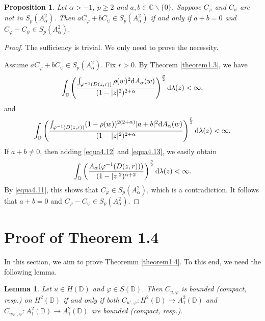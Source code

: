 \documentclass[preprint,12pt,times]{elsarticle}
\newtheorem{lemma}[theorem]{Lemma}
\newtheorem{proposition}[theorem]{Proposition}
\theoremstyle{definition}
\theoremstyle{remark}
\numberwithin{equation}{section}
\begin{document}
\begin{proposition}\label{proposition4.4}
Let $\alpha>-1$, $p\geq 2$ and $a,b\in\mathbb{C}\backslash\{0\}$. Suppose $C_{\varphi}$ and $C_{\psi}$ are not in $S_{p}(A_{\alpha}^2)$. Then $aC_{\varphi}+bC_{\psi}\in S_p(A_{\alpha}^2)$ if and only if $a+b=0$ and $C_{\varphi}-C_{\psi}\in S_p(A_{\alpha}^2)$.
\end{proposition}

\begin{proof}
The sufficiency is trivial. We only need to prove the necessity.

Assume $aC_{\varphi}+bC_{\psi}\in S_p(A_{\alpha}^2)$. Fix $r>0$. By Theorem \ref{theorem1.3}, we have
\begin{equation}\label{equa4.12}
\int_{\mathbb{D}}\left(\frac{\int_{\varphi^{-1}(D(z,r))}\rho(w)^2{\rm d}A_{\alpha}(w)}{(1-|z|^2)^{2+\alpha}}\right)^{\frac{p}{2}}{\rm d}\lambda(z)<\infty,
\end{equation} 
and
\begin{equation}\label{equa4.13}
\int_{\mathbb{D}}\left(\frac{\int_{\varphi^{-1}(D(z,r))}(1-\rho(w))^{2(2+\alpha)}|a+b|^2{\rm d}A_{\alpha}(w)}{(1-|z|^2)^{2+\alpha}}\right)^{\frac{p}{2}}{\rm d}\lambda(z)<\infty.
\end{equation}
If $a+b\neq 0$, then adding \eqref{equa4.12} and \eqref{equa4.13}, we easily obtain
\[\int_{\mathbb{D}}\left(\frac{A_{\alpha}(\varphi^{-1}(D(z,r)))}{(1-|z|^2)^{\alpha+2}}\right)^{\frac{p}{2}}{\rm d}\lambda(z)<\infty.\]
By \eqref{equa4.11}, this shows that $C_{\varphi}\in S_p(A_{\alpha}^2)$, which is a contradiction. It follows that $a+b=0$ and $C_{\varphi}-C_{\psi}\in S_p(A_{\alpha}^2)$.
\end{proof}



\section{Proof of Theorem 1.4}

In this section, we aim to prove Theoremm \ref{theorem1.4}. To this end, we need the following lemma.

\begin{lemma}\label{lemma5.1}
Let $u\in H(\mathbb{D})$ and $\varphi\in S(\mathbb{D})$. Then $C_{u,\varphi}$ is bounded (compact, resp.) on $H^2(\mathbb{D})$ if and only if both $C_{u',\varphi}: H^2(\mathbb{D})\to A_1^2(\mathbb{D})$ and $C_{u\varphi',\varphi}: A_1^2(\mathbb{D})\to A_{1}^2(\mathbb{D})$ are bounded (compact, resp.).
\end{lemma}
\end{document}
